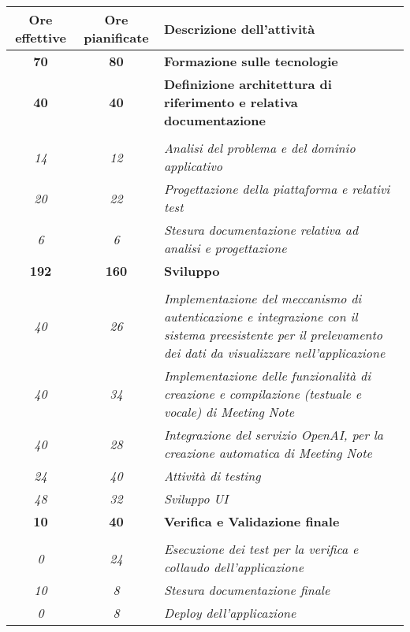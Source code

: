 \begin{table}
    \centering
    \begin{tabularx}{\textwidth}{|c|c|X|}
        \hline
        \textbf{Ore effettive} & \textbf{Ore pianificate} & \textbf{Descrizione dell'attività} \\\hline
        
        \textbf{70} & \textbf{80} & \textbf{Formazione sulle tecnologie} \\	 
        \hline
        
        \textbf{40} & \textbf{40} & \textbf{Definizione architettura di riferimento e relativa documentazione} \\ \hdashline 
        \multirow{3}{0cm}\\ 
        \textit{14} &
        \textit{12} & 
        \textit{Analisi del problema e del dominio applicativo} \\
        \textit{20} &
        \textit{22} & 
        \textit{Progettazione della piattaforma e relativi test} \\
        \textit{6} &
        \textit{6} & 
        \textit{Stesura documentazione relativa ad analisi e progettazione} \\
        \hline
        

        \textbf{192} & \textbf{160} & \textbf{Sviluppo}  \\ \hdashline 
        \multirow{5}{0cm}\\ 
        \textit{40} &
        \textit{26} & 
        \textit{Implementazione del meccanismo di autenticazione e integrazione con il sistema preesistente per il prelevamento dei dati da visualizzare nell'applicazione} \\
        \textit{40} &
        \textit{34} & 
        \textit{Implementazione delle funzionalità di creazione e compilazione (testuale e vocale) di Meeting Note} \\
        \textit{40} &
        \textit{28} & 
        \textit{Integrazione del servizio OpenAI, per la creazione automatica di Meeting Note} \\
        \textit{24} &
        \textit{40} & 
        \textit{Attività di testing} \\
        \textit{48} &
        \textit{32} & 
        \textit{Sviluppo UI} \\
        \hline
        
        \textbf{10} & \textbf{40} & \textbf{Verifica e Validazione finale}  \\ \hdashline 
        \multirow{3}{0cm}\\ 
        \textit{0} &
        \textit{24} & 
        \textit{Esecuzione dei test per la verifica e collaudo dell'applicazione} \\
        \textit{10} &
        \textit{8} & 
        \textit{Stesura documentazione finale} \\
        \textit{0} &
        \textit{8} & 
        \textit{Deploy dell'applicazione} \\
        \hline
        

\end{tabularx}
\end{table}
